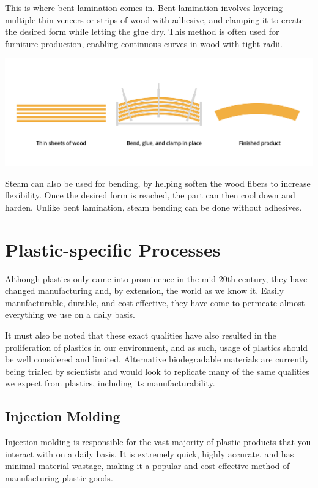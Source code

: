 This is where bent lamination comes in. Bent lamination involves layering multiple thin veneers or strips of wood with adhesive, and clamping it to create the desired form while letting the glue dry. This method is often used for furniture production, enabling continuous curves in wood with tight radii.
\begin{center}
    
    \includegraphics[width=.75\textwidth]{woodBend.png}
\end{center}


Steam can also be used for bending, by helping soften the wood fibers to increase flexibility. Once the desired form is reached, the part can then cool down and harden. Unlike bent lamination, steam bending can be done without adhesives.

\section{Plastic-specific Processes}

Although plastics only came into prominence in the mid 20th century, they have changed manufacturing and, by extension, the world as we know it. Easily manufacturable, durable, and cost-effective, they have come to permeate almost everything we use on a daily basis.

It must also be noted that these exact qualities have also resulted in the proliferation of plastics in our environment, and as such, usage of plastics should be well considered and limited. Alternative biodegradable materials are currently being trialed by scientists and would look to replicate many of the same qualities we expect from plastics, including its manufacturability.

\subsection{Injection Molding}

Injection molding is responsible for the vast majority of plastic products that you interact with on a daily basis. It is extremely quick, highly accurate, and has minimal material wastage, making it a popular and cost effective method of manufacturing plastic goods.

